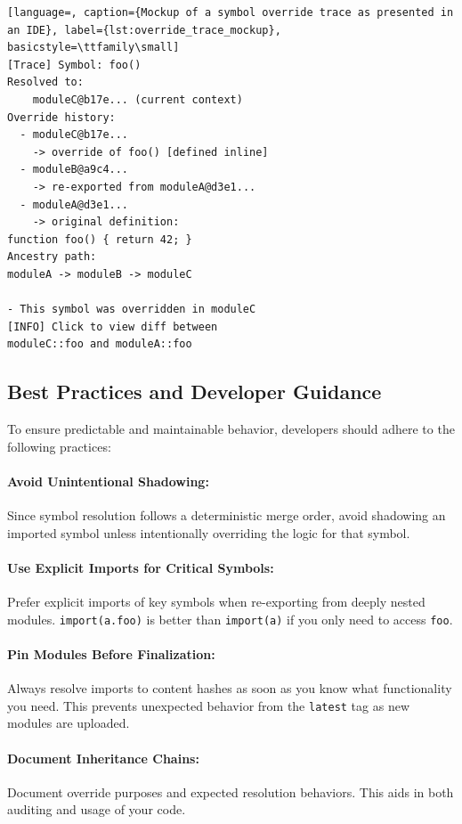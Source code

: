 \documentclass[sigplan,screen]{acmart}
\begin{document}
\begin{lstlisting}[language=, caption={Mockup of a symbol override trace as presented in an IDE}, label={lst:override_trace_mockup}, basicstyle=\ttfamily\small]
[Trace] Symbol: foo()
Resolved to:
	moduleC@b17e... (current context)
Override history:
  - moduleC@b17e...
    -> override of foo() [defined inline]
  - moduleB@a9c4...
    -> re-exported from moduleA@d3e1...
  - moduleA@d3e1...
    -> original definition:
function foo() { return 42; }
Ancestry path:
moduleA -> moduleB -> moduleC

- This symbol was overridden in moduleC
[INFO] Click to view diff between 
moduleC::foo and moduleA::foo
\end{lstlisting}

\subsection{Best Practices and Developer Guidance}
\label{sec:best-practices}

To ensure predictable and maintainable behavior, developers should adhere to the following practices:

\paragraph{Avoid Unintentional Shadowing:} Since symbol resolution follows a deterministic merge order, avoid shadowing an imported symbol unless intentionally overriding the logic for that symbol.

\paragraph{Use Explicit Imports for Critical Symbols:} Prefer explicit imports of key symbols when re-exporting from deeply nested modules. \texttt{import(a.foo)} is better than \texttt{import(a)} if you only need to access \texttt{foo}.

\paragraph{Pin Modules Before Finalization:} Always resolve imports to content hashes as soon as you know what functionality you need. This prevents unexpected behavior from the \texttt{latest} tag as new modules are uploaded. 

\paragraph{Document Inheritance Chains:} Document override purposes and expected resolution behaviors. This aids in both auditing and usage of your code.
\end{document}
